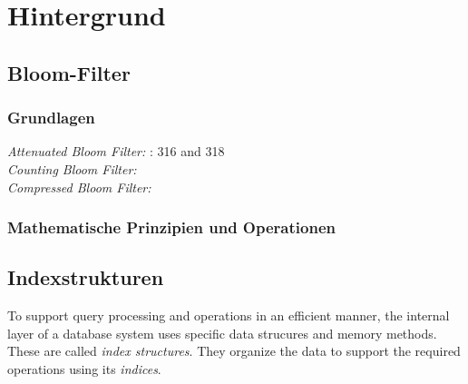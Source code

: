 \chapter{Hintergrund}\label{ch:hintergrund}
\section{Bloom-Filter}\label{sec:bloom}
\subsection{Grundlagen}\label{sec:bloom-basics}
\textit{Attenuated Bloom Filter:} \cite{Sakuma2011}: 316 and 318\\
\textit{Counting Bloom Filter:} \cite{Fan2000}\\
\textit{Compressed Bloom Filter:} \cite{Mitzenmacher2002}
\subsection{Mathematische Prinzipien und Operationen}\label{sec:mathe}
\section{Indexstrukturen}\label{sec:indexstrukturen}
To support query processing and operations in an efficient manner, the internal layer of a database system uses specific data strucures and memory methods. These are called \textit{index structures}. They organize the data to support the required operations using its \textit{indices}.


